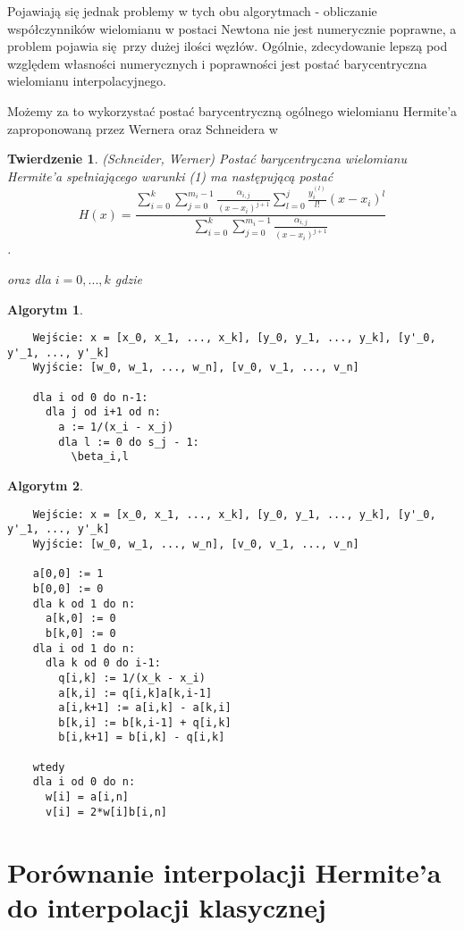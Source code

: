 \documentclass[10pt,wide]{mwart}
\newtheorem{tw}{Twierdzenie}
\theoremstyle{definition}
\newtheorem{alg}{Algorytm}
\begin{document}
Pojawiają się jednak problemy w tych obu algorytmach - obliczanie współczynników wielomianu w postaci Newtona nie jest numerycznie poprawne, a problem pojawia się przy dużej ilości węzłów.
Ogólnie, zdecydowanie lepszą pod względem własności numerycznych i poprawności jest postać barycentryczna wielomianu interpolacyjnego.

Możemy za to wykorzystać postać barycentryczną ogólnego wielomianu Hermite'a zaproponowaną przez Wernera oraz Schneidera w \cite{CSWW}
\begin{tw} (Schneider, Werner)
Postać barycentryczna wielomianu Hermite'a spełniającego warunki (1) ma następującą postać
\begin{equation}
  H(x) = \frac{\sum_{i=0}^{k}\sum_{j=0}^{m_i - 1}\frac{\alpha_{i,j}}{(x - x_i)^{j+1}}\sum_{l=0}^{j}\frac{y_i^{(l)}}{l!}(x-x_i)^l}{\sum_{i=0}^{k}\sum_{j=0}^{m_i - 1}\frac{\alpha_{i,j}}{(x - x_i)^{j+1}}}
\end{equation}.

oraz dla \(i=0,...,k\)
gdzie
\end{tw}
\begin{alg}
  \begin{verbatim}
    Wejście: x = [x_0, x_1, ..., x_k], [y_0, y_1, ..., y_k], [y'_0, y'_1, ..., y'_k]
    Wyjście: [w_0, w_1, ..., w_n], [v_0, v_1, ..., v_n]

    dla i od 0 do n-1:
      dla j od i+1 od n:
        a := 1/(x_i - x_j)
        dla l := 0 do s_j - 1:
          \beta_i,l

  \end{verbatim}
\end{alg}
\begin{alg}
  \begin{verbatim}
    Wejście: x = [x_0, x_1, ..., x_k], [y_0, y_1, ..., y_k], [y'_0, y'_1, ..., y'_k]
    Wyjście: [w_0, w_1, ..., w_n], [v_0, v_1, ..., v_n]

    a[0,0] := 1
    b[0,0] := 0
    dla k od 1 do n:
      a[k,0] := 0
      b[k,0] := 0
    dla i od 1 do n:
      dla k od 0 do i-1:
        q[i,k] := 1/(x_k - x_i)
        a[k,i] := q[i,k]a[k,i-1]
        a[i,k+1] := a[i,k] - a[k,i]
        b[k,i] := b[k,i-1] + q[i,k]
        b[i,k+1] = b[i,k] - q[i,k]

    wtedy
    dla i od 0 do n:
      w[i] = a[i,n]
      v[i] = 2*w[i]b[i,n]
  \end{verbatim}
\end{alg}

\section{Porównanie interpolacji Hermite'a do interpolacji klasycznej}
\end{document}
